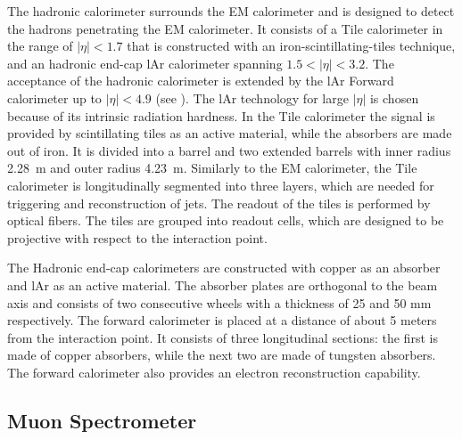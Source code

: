 The hadronic calorimeter surrounds the EM calorimeter and is designed to detect the hadrons penetrating the EM calorimeter.
It consists of a Tile calorimeter in the range of $|\eta|<1.7$ that is constructed with an iron-scintillating-tiles technique, and an hadronic end-cap lAr calorimeter spanning $1.5<|\eta|<3.2$. The acceptance of the hadronic calorimeter is extended by the lAr Forward calorimeter up to $|\eta|<4.9$ (see ). The lAr technology for large $|\eta|$ is chosen because of its intrinsic radiation hardness.
In the Tile calorimeter the signal is provided by scintillating tiles as an active material, while the absorbers are made out of iron. It is divided into a barrel and two extended barrels with inner radius 2.28~m and outer radius 4.23~m. Similarly to the EM calorimeter, the Tile calorimeter is longitudinally segmented into three layers, which are needed for triggering and reconstruction of jets. The readout of the tiles is performed by optical fibers. The tiles are grouped into readout cells, which are designed to be projective with respect to the interaction point.

The Hadronic end-cap calorimeters are constructed with copper as an absorber and lAr as an active material. The absorber plates are orthogonal to the beam axis and consists of two consecutive wheels
with a thickness of 25 and 50 mm respectively. The forward calorimeter is placed at a distance of about 5 meters from the interaction point. It consists of three longitudinal sections: the first is made of copper absorbers, while the next two are made of tungsten absorbers. The forward calorimeter also provides an electron reconstruction capability.


\subsection{Muon Spectrometer}

